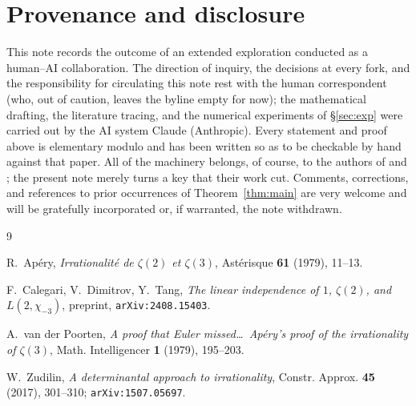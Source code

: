 \documentclass[11pt]{amsart}
\theoremstyle{definition}
\theoremstyle{remark}
\begin{document}
\section*{Provenance and disclosure}
This note records the outcome of an extended exploration conducted as
a human--AI collaboration. The direction of inquiry, the decisions at
every fork, and the responsibility for circulating this note rest with
the human correspondent (who, out of caution, leaves the byline empty
for now); the mathematical drafting, the literature tracing, and the
numerical experiments of \S\ref{sec:exp} were carried out by the AI
system Claude (Anthropic). Every statement and proof above is
elementary modulo \cite{CDT} and has been written so as to be
checkable by hand against that paper. All of the machinery belongs, of
course, to the authors of \cite{CDT} and \cite{Zudilin}; the present
note merely turns a key that their work cut. Comments, corrections,
and references to prior occurrences of Theorem~\ref{thm:main} are very
welcome and will be gratefully incorporated or, if warranted, the note
withdrawn.

\begin{thebibliography}{9}

 R.~Ap\'ery,
\emph{Irrationalit\'e de $\zeta(2)$ et $\zeta(3)$},
Ast\'erisque \textbf{61} (1979), 11--13.

 F.~Calegari, V.~Dimitrov, Y.~Tang,
\emph{The linear independence of $1$, $\zeta(2)$, and $L(2,\chi_{-3})$},
preprint, \texttt{arXiv:2408.15403}.

 A.~van der Poorten,
\emph{A proof that Euler missed\dots\ Ap\'ery's proof of the
irrationality of $\zeta(3)$},
Math. Intelligencer \textbf{1} (1979), 195--203.

 W.~Zudilin,
\emph{A determinantal approach to irrationality},
Constr. Approx. \textbf{45} (2017), 301--310;
\texttt{arXiv:1507.05697}.

\end{thebibliography}
\end{document}
